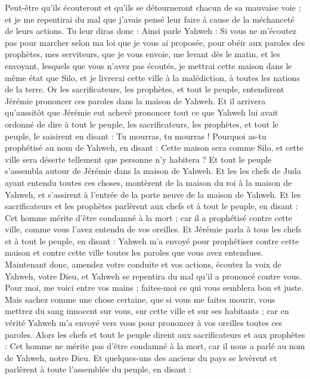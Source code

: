 \begin{multicols}{2}
Peut-être qu'ils écouteront et qu'ils se détourneront chacun de sa mauvaise voie ; et je me repentirai du mal que j'avais pensé leur faire à cause de la méchanceté de leurs actions.
Tu leur diras donc : Ainsi parle Yahweh : Si vous ne m'écoutez pas pour marcher selon ma loi que je vous ai proposée,
pour obéir aux paroles des prophètes, mes serviteurs, que je vous envoie, me levant dès le matin, et les envoyant, lesquels que vous n'avez pas écoutés,
je mettrai cette maison dans le même état que Silo, et je livrerai cette ville à la malédiction, à toutes les nations de la terre.
Or les sacrificateurs, les prophètes, et tout le peuple, entendirent Jérémie prononcer ces paroles dans la maison de Yahweh.
Et il arrivera qu'aussitôt que Jérémie eut achevé prononcer tout ce que Yahweh lui avait ordonné de dire à tout le peuple, les sacrificateurs, les prophètes, et tout le peuple, le saisirent en disant : Tu mourras, tu mourras !
Pourquoi as-tu prophétisé au nom de Yahweh, en disant : Cette maison sera comme Silo, et cette ville sera déserte tellement que personne n'y habitera ? Et tout le peuple s'assembla autour de Jérémie dans la maison de Yahweh.
Et les les chefs de Juda ayant entendu toutes ces choses, montèrent de la maison du roi à la maison de Yahweh, et s'assirent à l'entrée de la porte neuve de la maison de Yahweh.
Et les sacrificateurs et les prophètes parlèrent aux chefs et à tout le peuple, en disant : Cet homme mérite d'être condamné à la mort ; car il a prophétisé contre cette ville, comme vous l'avez entendu de vos oreilles.
Et Jérémie parla à tous les chefs et à tout le peuple, en disant : Yahweh m'a envoyé pour prophétiser contre cette maison et contre cette ville toutes les paroles que vous avez entendues.
Maintenant donc, amendez votre conduite et vos actions, écoutez la voix de Yahweh, votre Dieu, et Yahweh se repentira du mal qu'il a prononcé contre vous.
Pour moi, me voici entre vos mains ; faites-moi ce qui vous semblera bon et juste.
Mais sachez comme une chose certaine, que si vous me faites mourir, vous mettrez du sang innocent sur vous, sur cette ville et sur ses habitants ; car en vérité Yahweh m'a envoyé vers vous pour prononcer à vos oreilles toutes ces paroles.
Alors les chefs et tout le peuple dirent aux sacrificateurs et aux prophètes : Cet homme ne mérite pas d'être condamné à la mort, car il nous a parlé au nom de Yahweh, notre Dieu.
Et quelques-uns des anciens du pays se levèrent et parlèrent à toute l'assemblée du peuple, en disant :

\end{multicols}
